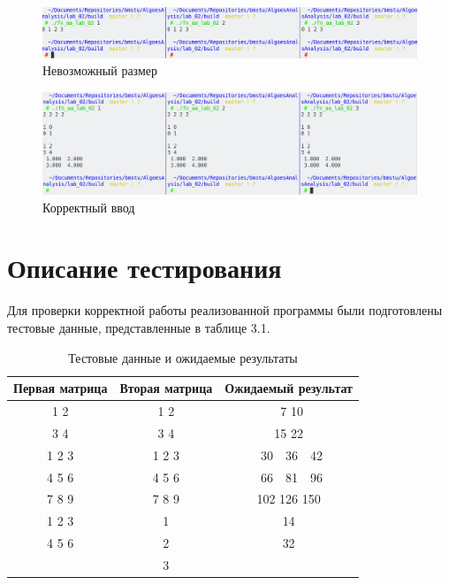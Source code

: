 \begin{figure}[H]
    \centering
    \includegraphics[scale=0.45]{images/test2.png}
    \caption{Невозможный размер}
    \label{img:zero-arg}
\end{figure}

\begin{figure}[H]
    \centering
    \includegraphics[scale=0.45]{images/test3.png}
    \caption{Корректный ввод}
    \label{img:zero-arg}
\end{figure}


\section{Описание тестирования}

Для проверки корректной работы реализованной программы были подготовлены тестовые данные, представленные в таблице 3.1.
\begin{table}[H]
    \caption{Тестовые данные и ожидаемые результаты}
    \centering
    \begin{tabular}{|c|c|c|}
        \hline
        Первая матрица & Вторая матрица & Ожидаемый результат \\
        \hline
        1 2 & 1 2 & \ 7 10 \\
        3 4 & 3 4 & 15 22 \\
        \hline
        1 2 3 & 1 2 3 & \ 30\ \ 36\ \ 42 \\
        4 5 6 & 4 5 6 & \ 66\ \ 81\ \ 96 \\
        7 8 9 & 7 8 9 & 102 126 150 \\
        \hline
        1 2 3 & 1 & 14 \\
        4 5 6 & 2 & 32 \\
              & 3 & \\
        \hline
    \end{tabular}
\end{table}


